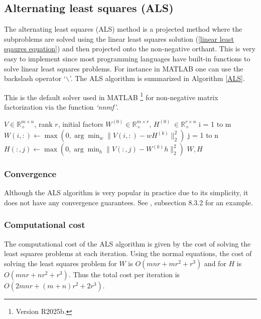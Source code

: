 \subsection{Alternating least squares (ALS)}
The alternating least squares (ALS) method is a projected method where the subproblems are solved using the linear least squares solution (\ref{linear least sqaures equation}) and then projected onto the non-negative orthant.
This is very easy to implement since most programming languages have built-in functions to solve linear least squares problems. For instance in MATLAB one can use the backslash operator `$\backslash$'. 
The ALS algorithm is summarized in Algorithm \ref{ALS}.
\par
This is the default solver used in MATLAB \footnote{Version R2025b.} for non-negative matrix factorization via the function \textit{`nnmf'}. 
\begin{algorithm}
    \caption{Alternating Least Squares for NMF}
    \label{ALS}
    \begin{algorithmic}
        \Require \( V \in \mathbb{R}_+^{m \times n} \), rank \( r \), initial factors \( W^{(0)} \in \mathbb{R}_+^{m \times r} \), \( H^{(0)} \
\in \mathbb{R}_+^{r \times n} \)
        \While{stopping criterion not met}
            \For i = 1 to m
                \State \( W(i,:) \leftarrow \max\left(0, \arg\min_{w} \|V(i,:) - w H^{(k)}\|_2^2 \right) \)
            \EndFor
            \For j = 1 to n
                \State \( H(:,j) \leftarrow \max\left(0, \arg\min_{h} \|V(:,j) - W^{(k)}h\|_2^2 \right) \)
            \EndFor
        \EndWhile
        \State \Return \( W, H \)
    \end{algorithmic}
\end{algorithm}
\subsubsection{Convergence}
Although the ALS algorithm is very popular in practice due to its simplicity, it does not have any convergence guarantees. See \cite{gillis2020nonnegative}, subsection 8.3.2 for an example.
\subsubsection{Computational cost}
The computational cost of the ALS algorithm is given by the cost of solving the least squares problems at each iteration.
Using the normal equations, the cost of solving the least squares problem for \( W \) is $O(mnr + mr^2 + r^3)$ and for \( H \) is $O(mnr + nr^2 + r^3)$. 
Thus the total cost per iteration is $O(2mnr + (m+n)r^2 + 2r^3)$.
